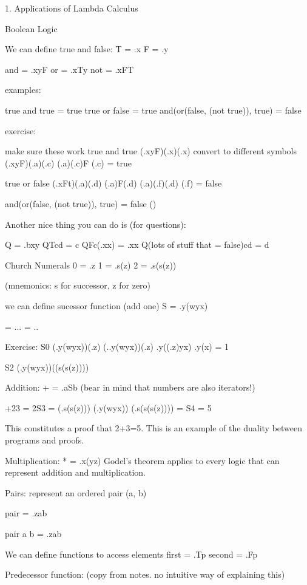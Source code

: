 1. Applications of Lambda Calculus

Boolean Logic

We can define true and false:
T = \xy.x
F = \xy.y

and = \xy.xyF
or = \xy.xTy
not = \x.xFT

examples:

true and true = true
true or false = true
and(or(false, (not true)), true) = false

exercise:

make sure these work
true and true
(\xy.xyF)(\xy.x)(\xy.x)
convert to different symbols
(\xy.xyF)(\ab.a)(\cd.c)
(\ab.a)(\cd.c)F
(\cd.c) = true

true or false
(\xy.xFt)(\ab.a)(\cd.d)
(\ab.a)F(\cd.d)
(\ab.a)(\ef.f)(\cd.d)
(\ef.f) = false

and(or(false, (not true)), true) = false
()

Another nice thing you can do is (for questions):

Q = \bxy.bxy
QTcd = c
QFc(\x.xx) = \x.xx
Q(lots of stuff that = false)cd = d

Church Numerals
0 = \sz.z
1 = \sz.s(z)
2 = \sz.s(s(z))

(mnemonics: s for successor, z for zero)

we can define sucessor function (add one)
S = \wyx.y(wyx)

\wyx = \w.\y.\x. = \w.\yx.

Exercise:
S0
(\wyx.y(wyx))(\sz.z)
(\w.\yx.y(wyx))(\sz.z)
\yx.y((\sz.z)yx)
\yx.y(x) = 1

S2
(\wyx.y(wyx))(\sz(s(s(z))))

Addition:
+ = \ab.aSb
(bear in mind that numbers are also iterators!)

+23 = 2S3 = (\sz.s(s(z))) (\wyx.y(wyx)) (\sz.s(s(s(z))))
= S4 = 5

This constitutes a proof that 2+3=5. This is an example of the duality between programs and proofs.

Multiplication:
* = \xyz.x(yz)
Godel's theorem applies to every logic that can represent addition and multiplication.

Pairs:
represent an ordered pair (a, b)

pair = \abz.zab

pair a b = \z.zab

We can define functions to access elements
first = \p.Tp
second = \p.Fp

Predecessor function:
(copy from notes. no intuitive way of explaining this)

